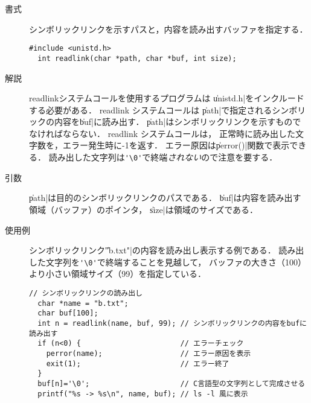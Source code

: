 \begin{description}
\item[書式] シンボリックリンクを示すパスと，内容を読み出すバッファを指定する．
\begin{lstlisting}[numbers=none]
  #include <unistd.h>
  int readlink(char *path, char *buf, int size);
\end{lstlisting}

\item[解説] readlinkシステムコールを使用するプログラムは
\|unistd.h|をインクルードする必要がある．
readlink システムコールは
\|path|で指定されるシンボリックの内容を\|buf|に読み出す．
\|path|はシンボリックリンクを示すものでなければならない．
readlink システムコールは，
正常時に読み出した文字数を，エラー発生時に-1を返す．
エラー原因は\|perror()|関数で表示できる．
読み出した文字列は\verb;'\0';で終端\emph{されない}ので注意を要する．

\item[引数] \|path|は目的のシンボリックリンクのパスである．
\|buf|は内容を読み出す領域（バッファ）のポインタ，
\|size|は領域のサイズである．

\item[使用例] シンボリックリンク\|"b.txt"|の内容を読み出し表示する例である．
読み出した文字列を\verb;'\0';で終端することを見越して，
バッファの大きさ（100）より小さい領域サイズ（99）を指定している．
\begin{lstlisting}[numbers=none]
  // シンボリックリンクの読み出し
  char *name = "b.txt";
  char buf[100];
  int n = readlink(name, buf, 99); // シンボリックリンクの内容をbufに読み出す
  if (n<0) {                       // エラーチェック
    perror(name);                  // エラー原因を表示
    exit(1);                       // エラー終了
  }
  buf[n]='\0';                     // C言語型の文字列として完成させる
  printf("%s -> %s\n", name, buf); // ls -l 風に表示
\end{lstlisting}
\end{description}

